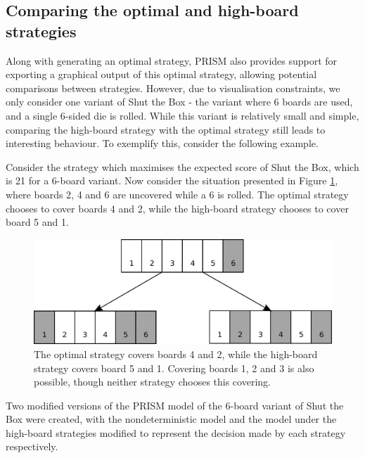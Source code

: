 \subsection{Comparing the optimal and high-board strategies}
\label{cs1:compare-strats}
Along with generating an optimal strategy, PRISM also provides support for exporting a graphical output of this optimal strategy, allowing potential comparisons between strategies. However, due to visualisation constraints, we only consider one variant of Shut the Box - the variant where 6 boards are used, and a single 6-sided die is rolled. While this variant is relatively small and simple, comparing the high-board strategy with the optimal strategy still leads to interesting behaviour. To exemplify this, consider the following example.

\begin{example}
\label{cs1:greedy-optimal}

Consider the strategy which maximises the expected score of Shut the Box, which is 21 for a 6-board variant. Now consider the situation presented in Figure \ref{cs1:optimal_high_board}, where boards 2, 4 and 6 are uncovered while a 6 is rolled. The optimal strategy chooses to cover boards 4 and 2, while the high-board strategy chooses to cover board 5 and 1.

\begin{figure}
    \centering
    \includegraphics[width=\textwidth]{images/ShutTheBox/optimal_high_board.pdf}
    \caption{The optimal strategy covers boards 4 and 2, while the high-board strategy covers board 5 and 1. Covering boards 1, 2 and 3 is also possible, though neither strategy chooses this covering.}
\label{cs1:optimal_high_board}
\end{figure}

Two modified versions of the PRISM model of the 6-board variant of Shut the Box were created, with the nondeterministic model and the model under the high-board strategies modified to represent the decision made by each strategy respectively.


\end{example}
